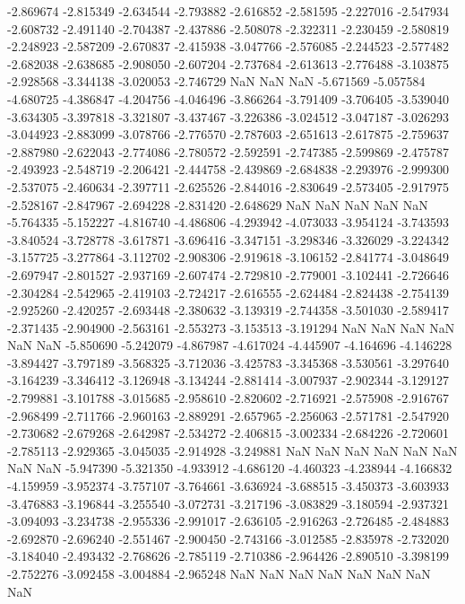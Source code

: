 -2.869674
-2.815349
-2.634544
-2.793882
-2.616852
-2.581595
-2.227016
-2.547934
-2.608732
-2.491140
-2.704387
-2.437886
-2.508078
-2.322311
-2.230459
-2.580819
-2.248923
-2.587209
-2.670837
-2.415938
-3.047766
-2.576085
-2.244523
-2.577482
-2.682038
-2.638685
-2.908050
-2.607204
-2.737684
-2.613613
-2.776488
-3.103875
-2.928568
-3.344138
-3.020053
-2.746729
NaN
NaN
NaN
-5.671569
-5.057584
-4.680725
-4.386847
-4.204756
-4.046496
-3.866264
-3.791409
-3.706405
-3.539040
-3.634305
-3.397818
-3.321807
-3.437467
-3.226386
-3.024512
-3.047187
-3.026293
-3.044923
-2.883099
-3.078766
-2.776570
-2.787603
-2.651613
-2.617875
-2.759637
-2.887980
-2.622043
-2.774086
-2.780572
-2.592591
-2.747385
-2.599869
-2.475787
-2.493923
-2.548719
-2.206421
-2.444758
-2.439869
-2.684838
-2.293976
-2.999300
-2.537075
-2.460634
-2.397711
-2.625526
-2.844016
-2.830649
-2.573405
-2.917975
-2.528167
-2.847967
-2.694228
-2.831420
-2.648629
NaN
NaN
NaN
NaN
NaN
-5.764335
-5.152227
-4.816740
-4.486806
-4.293942
-4.073033
-3.954124
-3.743593
-3.840524
-3.728778
-3.617871
-3.696416
-3.347151
-3.298346
-3.326029
-3.224342
-3.157725
-3.277864
-3.112702
-2.908306
-2.919618
-3.106152
-2.841774
-3.048649
-2.697947
-2.801527
-2.937169
-2.607474
-2.729810
-2.779001
-3.102441
-2.726646
-2.304284
-2.542965
-2.419103
-2.724217
-2.616555
-2.624484
-2.824438
-2.754139
-2.925260
-2.420257
-2.693448
-2.380632
-3.139319
-2.744358
-3.501030
-2.589417
-2.371435
-2.904900
-2.563161
-2.553273
-3.153513
-3.191294
NaN
NaN
NaN
NaN
NaN
NaN
-5.850690
-5.242079
-4.867987
-4.617024
-4.445907
-4.164696
-4.146228
-3.894427
-3.797189
-3.568325
-3.712036
-3.425783
-3.345368
-3.530561
-3.297640
-3.164239
-3.346412
-3.126948
-3.134244
-2.881414
-3.007937
-2.902344
-3.129127
-2.799881
-3.101788
-3.015685
-2.958610
-2.820602
-2.716921
-2.575908
-2.916767
-2.968499
-2.711766
-2.960163
-2.889291
-2.657965
-2.256063
-2.571781
-2.547920
-2.730682
-2.679268
-2.642987
-2.534272
-2.406815
-3.002334
-2.684226
-2.720601
-2.785113
-2.929365
-3.045035
-2.914928
-3.249881
NaN
NaN
NaN
NaN
NaN
NaN
NaN
NaN
-5.947390
-5.321350
-4.933912
-4.686120
-4.460323
-4.238944
-4.166832
-4.159959
-3.952374
-3.757107
-3.764661
-3.636924
-3.688515
-3.450373
-3.603933
-3.476883
-3.196844
-3.255540
-3.072731
-3.217196
-3.083829
-3.180594
-2.937321
-3.094093
-3.234738
-2.955336
-2.991017
-2.636105
-2.916263
-2.726485
-2.484883
-2.692870
-2.696240
-2.551467
-2.900450
-2.743166
-3.012585
-2.835978
-2.732020
-3.184040
-2.493432
-2.768626
-2.785119
-2.710386
-2.964426
-2.890510
-3.398199
-2.752276
-3.092458
-3.004884
-2.965248
NaN
NaN
NaN
NaN
NaN
NaN
NaN
NaN
